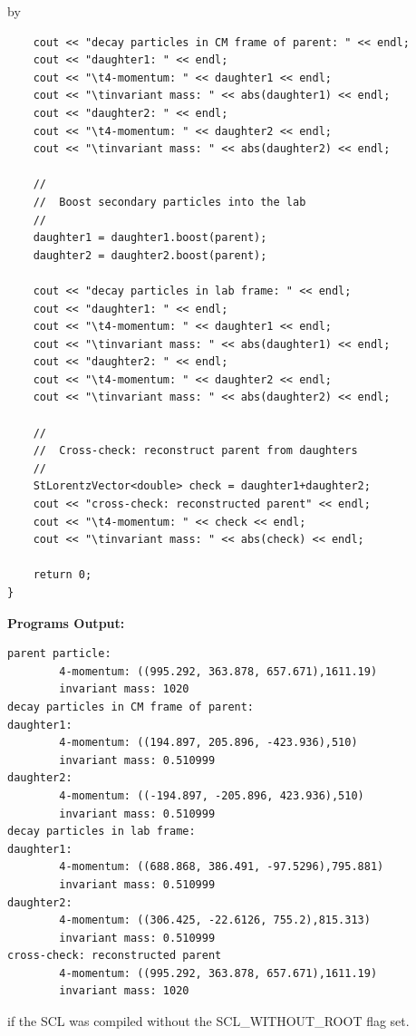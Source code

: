 \documentclass[twoside]{article}
\newcommand{\name}[1]{\textsf{#1}}%
\newcommand{\entrylabel}[1]{\mbox{\textbf{{#1}}}\hfil}%
\newenvironment{entry}
{\begin{list}{}%
    {\renewcommand{\makelabel}{\entrylabel}%
     \setlength{\labelwidth}{90pt}%
     \setlength{\leftmargin}{\labelwidth}
     \advance\leftmargin by \labelsep%
      }%
    }%
  {\end{list}}
\newcommand{\Entrylabel}[1]%
{\raisebox{0pt}[1ex][0pt]{\makebox[\labelwidth][l]%
    {\parbox[t]{\labelwidth}{\hspace{0pt}\textbf{{#1}}}}}}
\newenvironment{Entry}%
{\renewcommand{\entrylabel}{\Entrylabel}\begin{entry}}%
  {\end{entry}}
\begin{document}
\begin{description}
\begin{Entry}
{\begin{verbatim}
    cout << "decay particles in CM frame of parent: " << endl;
    cout << "daughter1: " << endl;
    cout << "\t4-momentum: " << daughter1 << endl;
    cout << "\tinvariant mass: " << abs(daughter1) << endl;
    cout << "daughter2: " << endl;
    cout << "\t4-momentum: " << daughter2 << endl;
    cout << "\tinvariant mass: " << abs(daughter2) << endl;
    
    //
    //  Boost secondary particles into the lab
    //
    daughter1 = daughter1.boost(parent);
    daughter2 = daughter2.boost(parent);
    
    cout << "decay particles in lab frame: " << endl;
    cout << "daughter1: " << endl;
    cout << "\t4-momentum: " << daughter1 << endl;
    cout << "\tinvariant mass: " << abs(daughter1) << endl;
    cout << "daughter2: " << endl;
    cout << "\t4-momentum: " << daughter2 << endl;
    cout << "\tinvariant mass: " << abs(daughter2) << endl;

    //
    //  Cross-check: reconstruct parent from daughters
    //
    StLorentzVector<double> check = daughter1+daughter2;
    cout << "cross-check: reconstructed parent" << endl;
    cout << "\t4-momentum: " << check << endl;
    cout << "\tinvariant mass: " << abs(check) << endl;
        
    return 0;
}
\end{verbatim}
}%
{\bf Programs Output:}
{\footnotesize
\begin{verbatim}
parent particle: 
        4-momentum: ((995.292, 363.878, 657.671),1611.19)
        invariant mass: 1020
decay particles in CM frame of parent: 
daughter1: 
        4-momentum: ((194.897, 205.896, -423.936),510)
        invariant mass: 0.510999
daughter2: 
        4-momentum: ((-194.897, -205.896, 423.936),510)
        invariant mass: 0.510999
decay particles in lab frame: 
daughter1: 
        4-momentum: ((688.868, 386.491, -97.5296),795.881)
        invariant mass: 0.510999
daughter2: 
        4-momentum: ((306.425, -22.6126, 755.2),815.313)
        invariant mass: 0.510999
cross-check: reconstructed parent
        4-momentum: ((995.292, 363.878, 657.671),1611.19)
        invariant mass: 1020
\end{verbatim}
} %
\end{Entry}

\clearpage

%
    if the SCL was compiled without the \name{SCL\_WITHOUT\_ROOT} flag set.
%

\end{description}
\end{document}
